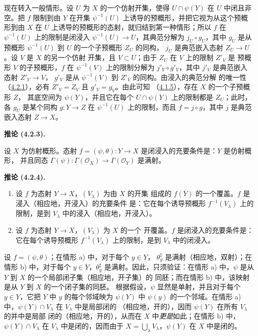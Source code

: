 \documentclass[UTF8,fontset=none,11pt,oneside,openany]{ctexbook}
\newenvironment{corollary}[1][]{%
  \par\medskip\noindent\textbf{推论 (#1).}\ %
}{\par}
\newcommand{\oldpage}[2][]{%
  \hypertarget{ega-source-page-#1-#2}{}%
  \marginnote{\scriptsize\textbf{#1}~|~#2}\ignorespaces}
\let\EGAOriginalLabel\label
\renewcommand{\label}[1]{\phantomsection\EGAOriginalLabel{#1}}
\begin{document}
\begin{enumerate}
  现在转入一般情形。设 $U$ 为 $X$ 的一个仿射开集，使得
  $U\cap\psi(Y)$ 在 $U$ 中闭且非空。把 $f$ 限制到由 $Y$ 在开集
  $\psi^{-1}(U)$ 上诱导的预概形，并把它视为从这个预概形到由 $X$
  在 $U$ 上诱导的预概形的态射，就归结到第一种情形；所以 $f$ 在
  $\psi^{-1}(U)$ 上的限制是闭浸入
  $\psi^{-1}(U)\to U$，其典范分解为 $j_U\circ g_U$，其中 $g_U$
  是从预概形 $\psi^{-1}(U)$ 到 $U$ 的一个子预概形 $Z_U$ 的同构，
  $j_U$ 是典范嵌入态射 $Z_U\to U$。设 $V$ 是 $X$ 的另一个仿射
  开集，且 $V\subset U$；由于 $Z_U$ 在 $V$ 上的限制 $Z'_V$ 是
  预概形 $V$ 的子预概形，$f$ 在 $\psi^{-1}(V)$ 上的限制分解为
  $j'_V\circ g'_V$，其中 $j'_V$ 是典范嵌入态射 $Z'_V\to V$，
  $g'_V$ 是从 $\psi^{-1}(V)$ 到 $Z'_V$ 的同构。由浸入的典范分解
  的唯一性（\hyperref[I.4.2.1-fr]{4.2.1}），必有
  $Z'_V=Z_V$ 且 $g'_V=g_V$。由此可知
  （\hyperref[I.4.1.5-fr]{4.1.5}），存在 $X$ 的一个子预概形 $Z$，
  其底空间为 $\psi(Y)$，并且它在每个 $U\cap\psi(Y)$ 上的限制都是
  $Z_U$；此时，各 $g_U$ 是某个同构 $g:Y\to Z$ 在
  $\psi^{-1}(U)$ 上的限制，而且 $f=j\circ g$，其中 $j$ 是典范
  嵌入态射 $Z\to X$。
\end{enumerate}

\begin{corollary}[4.2.3]
\label{I.4.2.3-fr}
设 $X$ 为仿射概形。态射
$f=(\psi,\theta):Y\to X$ 是闭浸入的充要条件是：$Y$ 是仿射概形，
并且同态
$\Gamma(\psi):\Gamma(\mathscr{O}_X)\to\Gamma(\mathscr{O}_Y)$ 是满射。
\end{corollary}

\begin{corollary}[4.2.4]
\label{I.4.2.4-fr}
\begin{enumerate}
  \item[a)] 设 $f$ 为态射 $Y\to X$，$(V_\lambda)$ 为由 $X$ 的开集
  组成的 $f(Y)$ 的一个覆盖。$f$ 是浸入（相应地，开浸入）的充要条件
\oldpage[I]{124}
  是：它在每个诱导预概形 $f^{-1}(V_\lambda)$ 上的限制，是到
  $V_\lambda$ 中的浸入（相应地，开浸入）。
  \item[b)] 设 $f$ 为态射 $Y\to X$，$(V_\lambda)$ 为 $X$ 的一个
  开覆盖。$f$ 是闭浸入的充要条件是：它在每个诱导预概形
  $f^{-1}(V_\lambda)$ 上的限制，是到 $V_\lambda$ 中的闭浸入。
\end{enumerate}
\end{corollary}

设 $f=(\psi,\theta)$；在情形 a) 中，对于每个 $y\in Y$，
$\theta_y^\sharp$ 是满射（相应地，双射）；在情形 b) 中，对于每个
$y\in Y$，$\theta_y^\sharp$ 是满射。因此，只须验证：在情形 a)
中，$\psi$ 是从 $Y$ 到 $X$ 的一个局部闭子集（相应地，开子集）的
同胚；而在情形 b) 中，该映射是从 $Y$ 到 $X$ 的一个闭子集的同胚。
根据假设，$\psi$ 显然是单射，并且对于每个 $y\in Y$，它把 $Y$ 中
$y$ 的每个邻域映为 $\psi(Y)$ 中 $\psi(y)$ 的一个邻域。在情形 a)
中，$\psi(Y)\cap V_\lambda$ 在 $V_\lambda$ 中是局部闭的
（相应地，开的），因而 $\psi(Y)$ 在所有 $V_\lambda$ 的并中是局部
闭的（相应地，开的），从而在 $X$ 中\emph{更是}如此；在情形 b) 中，
$\psi(Y)\cap V_\lambda$ 在 $V_\lambda$ 中是闭的，因而由于
$X=\bigcup_\lambda V_\lambda$，$\psi(Y)$ 在 $X$ 中是闭的。
\end{document}
